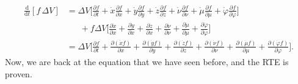 \documentclass[10pt]{article}
\newcommand{\dee}{\mathrm{d}}
\begin{document}
\begin{itemize}
    \begin{align*}
      \frac{\dee}{\dee t}[f\,\Delta V]
      &= \Delta V \bigg[
        \frac{\partial f}{\partial t}
        + \dot x \frac{\partial f}{\partial x}
        + \dot y \frac{\partial f}{\partial y}
        + \dot z \frac{\partial f}{\partial z}
        + \dot \nu \frac{\partial f}{\partial \nu}
        + \dot \mu \frac{\partial f}{\partial \mu}
        + \dot \varphi \frac{\partial f}{\partial \varphi}        
      \bigg]\\
      &\phantom{\ =} + f \Delta V \bigg[ 
          \frac{\partial \dot x}{\partial x}
        + \frac{\partial \dot y}{\partial x}
        + \frac{\partial \dot z}{\partial x}
        + \frac{\partial \dot \nu}{\partial \nu}
        + \frac{\partial \dot \mu}{\partial \mu}
        + \frac{\partial \dot \varphi}{\partial \varphi}
      \bigg]\\
      &= \Delta V \bigg[ 
          \frac{\partial f}{\partial t} 
        + \frac{\partial (\dot x f)}{\partial x} 
        + \frac{\partial (\dot y f)}{\partial y} 
        + \frac{\partial (\dot z f)}{\partial z} 
        + \frac{\partial (\dot \nu f)}{\partial \nu} 
        + \frac{\partial (\dot \mu f)}{\partial \mu} 
        + \frac{\partial (\dot \varphi f)}{\partial \varphi} 
      \bigg].
    \end{align*}  
    Now, we are back at the equation that we have seen before, and the RTE is proven.
  \end{itemize}
\end{document}
